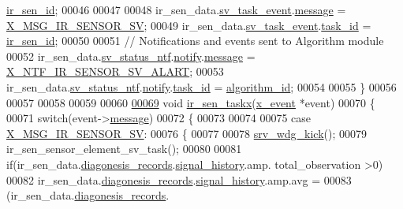 \begin{DoxyCode}
      \hyperlink{a00045_a624782f67b3870f0dde83528770ef5fc}{ir\_sen\_id};
00046 
00047 
00048     ir\_sen\_data.\hyperlink{a00023_a43c345f39ea3aefbb60ef1ef57fe5d83}{sv\_task\_event}.\hyperlink{a00036_adf9665938515a20c283eea2c978cf80d}{message}                    = 
      \hyperlink{a00023_a16b09a45fdc504b8b00d634b49c820b4}{X\_MSG\_IR\_SENSOR\_SV};
00049     ir\_sen\_data.\hyperlink{a00023_a43c345f39ea3aefbb60ef1ef57fe5d83}{sv\_task\_event}.\hyperlink{a00036_a21b41e494a28583d4da10f1afb1c5328}{task\_id}                = 
      \hyperlink{a00045_a624782f67b3870f0dde83528770ef5fc}{ir\_sen\_id};
00050 
00051     \textcolor{comment}{// Notifications and events sent to Algorithm module}
00052     ir\_sen\_data.\hyperlink{a00023_afdc0e2c51e8e301d264700f4f9c10740}{sv\_status\_ntf}.\hyperlink{a00021_a8e6a04c2283f9fd7b8dcbc62faba5847}{notify}.\hyperlink{a00036_adf9665938515a20c283eea2c978cf80d}{message}                       = 
      \hyperlink{a00021_a0eb06525326cff5fc0fb38f141d6be8e}{X\_NTF\_IR\_SENSOR\_SV\_ALART};
00053     ir\_sen\_data.\hyperlink{a00023_afdc0e2c51e8e301d264700f4f9c10740}{sv\_status\_ntf}.\hyperlink{a00021_a8e6a04c2283f9fd7b8dcbc62faba5847}{notify}.\hyperlink{a00036_a21b41e494a28583d4da10f1afb1c5328}{task\_id}                   = 
      \hyperlink{a00021_aff3e3d622fcd96787628167d3c1856f9}{algorithm\_id};
00054 
00055 \}
00056 
00057 
00058 
00059 
00060 
\hypertarget{a00045_source_l00069}{}\hyperlink{a00045_a24529100c87dfc257e9b56f7f0bcfa78}{00069} \textcolor{keywordtype}{void} \hyperlink{a00045_a24529100c87dfc257e9b56f7f0bcfa78}{ir\_sen\_taskx}(\hyperlink{a00036_de/d37/a00849}{x\_event} *event)
00070 \{
00071     \textcolor{keywordflow}{switch}(event->\hyperlink{a00036_adf9665938515a20c283eea2c978cf80d}{message})
00072     \{
00073 
00074 
00075         \textcolor{keywordflow}{case} \hyperlink{a00023_a16b09a45fdc504b8b00d634b49c820b4}{X\_MSG\_IR\_SENSOR\_SV}:
00076         \{
00077 
00078             \hyperlink{a00067_a710d148845397582739d170341f3d3d9}{srv\_wdg\_kick}();
00079             ir\_sen\_sensor\_element\_sv\_task();
00080 
00081             \textcolor{keywordflow}{if}(ir\_sen\_data.\hyperlink{a00023_a7ae905b560513ad201e58c2f63375030}{diagonesis\_records}.\hyperlink{a00017_affb63906d23cb1cb7787d61eaaedfb60}{signal\_history}.amp.
      total\_observation >0)
00082                 ir\_sen\_data.\hyperlink{a00023_a7ae905b560513ad201e58c2f63375030}{diagonesis\_records}.\hyperlink{a00017_affb63906d23cb1cb7787d61eaaedfb60}{signal\_history}.amp.avg =
00083                         (ir\_sen\_data.\hyperlink{a00023_a7ae905b560513ad201e58c2f63375030}{diagonesis\_records}.

\end{DoxyCode}
